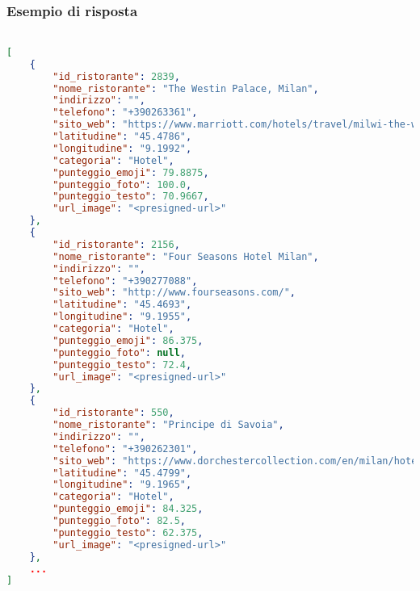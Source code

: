 \subsubsection{Esempio di risposta}
\begin{lstlisting}[language=json, caption={Esempio di richiesta \texttt{/getLabelCategoria}}, captionpos=b]

[
    {
        "id_ristorante": 2839,
        "nome_ristorante": "The Westin Palace, Milan",
        "indirizzo": "",
        "telefono": "+390263361",
        "sito_web": "https://www.marriott.com/hotels/travel/milwi-the-westin-palace-milan/?scid=5d6c9ba8-fdb3-45cd-90d4-fc3cbfe3681c&y_source=1_Mjc4MjEzMi01NTktbG9jYXRpb24ud2Vic2l0ZQ%3D%3D",
        "latitudine": "45.4786",
        "longitudine": "9.1992",
        "categoria": "Hotel",
        "punteggio_emoji": 79.8875,
        "punteggio_foto": 100.0,
        "punteggio_testo": 70.9667,
        "url_image": "<presigned-url>"
    },
    {
        "id_ristorante": 2156,
        "nome_ristorante": "Four Seasons Hotel Milan",
        "indirizzo": "",
        "telefono": "+390277088",
        "sito_web": "http://www.fourseasons.com/",
        "latitudine": "45.4693",
        "longitudine": "9.1955",
        "categoria": "Hotel",
        "punteggio_emoji": 86.375,
        "punteggio_foto": null,
        "punteggio_testo": 72.4,
        "url_image": "<presigned-url>"
    },
    {
        "id_ristorante": 550,
        "nome_ristorante": "Principe di Savoia",
        "indirizzo": "",
        "telefono": "+390262301",
        "sito_web": "https://www.dorchestercollection.com/en/milan/hotel-principe-di-savoia",
        "latitudine": "45.4799",
        "longitudine": "9.1965",
        "categoria": "Hotel",
        "punteggio_emoji": 84.325,
        "punteggio_foto": 82.5,
        "punteggio_testo": 62.375,
        "url_image": "<presigned-url>"
    },
    ...
]


\end{lstlisting}



